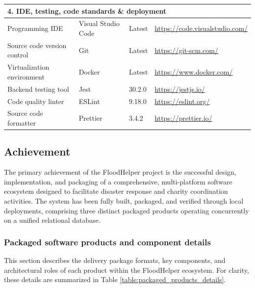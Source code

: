 \documentclass[../Main.tex]{subfiles}
\begin{document}
\begin{longtable}{ p{} p{} p{} p{} }
    \multicolumn{4}{l}{\textbf{4. IDE, testing, code standards \& deployment}}                                                                                   \\ \hline
    Programming IDE                 & Visual Studio Code                    & Latest           & \url{https://code.visualstudio.com/}                            \\
    Source code version control     & Git                                   & Latest           & \url{https://git-scm.com/}                                      \\
    Virtualization environment      & Docker                                & Latest           & \url{https://www.docker.com/}                                   \\
    Backend testing tool            & Jest                                  & 30.2.0           & \url{https://jestjs.io/}                                        \\
    Code quality linter             & ESLint                                & 9.18.0           & \url{https://eslint.org/}                                       \\
    Source code formatter           & Prettier                              & 3.4.2            & \url{https://prettier.io/}                                      \\ \hline
\end{longtable}

\subsection{Achievement}

The primary achievement of the FloodHelper project is the successful design, implementation, and packaging of a comprehensive, multi-platform software ecosystem designed to facilitate disaster response and charity coordination activities. The system has been fully built, packaged, and verified through local deployments, comprising three distinct packaged products operating concurrently on a unified relational database.

\subsubsection{Packaged software products and component details}

This section describes the delivery package formats, key components, and architectural roles of each product within the FloodHelper ecosystem. For clarity, these details are summarized in Table \ref{table:packaged_products_details}.
\end{document}
